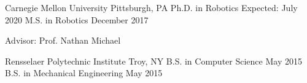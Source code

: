 
\begin{cventries}
  \cventrydouble
  {Carnegie Mellon University}
  {Pittsburgh, PA}
  {Ph.D. in Robotics}
  {Expected: July 2020}
  {}
  {M.S. in Robotics}
  {December 2017}
  {
    \begin{cvitems} %
    \item {Advisor: Prof. Nathan Michael}
    \end{cvitems}
  }

  \cventrydouble
  {Rensselaer Polytechnic Institute} %
  {Troy, NY} %
  {B.S. in Computer Science} %
  {May 2015} %
  {}
  {B.S. in Mechanical Engineering} %
  {May 2015} %
  {}
\end{cventries}

